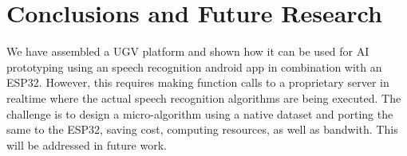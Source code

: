 \documentclass[conference]{IEEEtran}
\begin{document}
\section{Conclusions and Future Research}
We have assembled a UGV platform and shown how it can be used for AI prototyping using an speech recognition  android app in combination with an ESP32.  However, this requires making function calls to a proprietary server in realtime where the actual speech recognition algorithms are being executed.  The challenge is to design a micro-algorithm using a native dataset and porting the same to the ESP32, saving cost, computing resources, as well as bandwith.  This will be addressed in future work.



\end{document}
